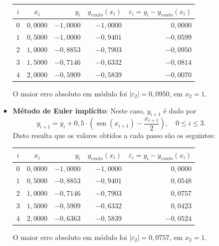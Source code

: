 \documentclass[12pt,a4paper]{article}
\newcommand*\sen{\operatorname{sen}}
\begin{document}
\begin{enumerate}
\begin{enumerate}
\begin{itemize}
\medskip
\begin{center}
\begin{tabular}{ccrrr}
\hline
$i$ & $x_i$ & $y_i$ & $y_{exato}(x_i)$ & $\varepsilon_i = y_i-y_{exato}(x_i)$ \\ \hline
$0$ & $0,0000$ & $-1,0000$ & $-1,0000$ & $ 0,0000$ \\
$1$ & $0,5000$ & $-1,0000$ & $-0,9401$ & $-0,0599$ \\
$2$ & $1,0000$ & $-0,8853$ & $-0,7903$ & $-0,0950$ \\
$3$ & $1,5000$ & $-0,7146$ & $-0,6332$ & $-0,0814$ \\
$4$ & $2,0000$ & $-0,5909$ & $-0,5839$ & $-0,0070$ \\
\hline
\end{tabular}
\end{center}
\medskip
O maior erro absoluto em módulo foi $|\varepsilon_2| = 0,0950$, em $x_2 = 1$.

\item \textbf{Método de Euler implícito}: Neste caso, $y_{i + 1}$ é dado por
\[
y_{i + 1}
= y_{i} + 0,5 \cdot \left( \sen(x_{i + 1}) - \frac{x_{i + 1}}{2} \right),
\quad 0 \leq i \leq 3.
\]
Disto resulta que os valores obtidos a cada passo são os seguintes:

\medskip
\begin{center}
\begin{tabular}{ccrrr}
\hline
$i$ & $x_i$ & $y_i$ & $y_{exato}(x_i)$ & $\varepsilon_i = y_i-y_{exato}(x_i)$ \\ \hline
$0$ & $0,0000$ & $-1,0000$ & $-1,0000$ & $ 0,0000$ \\
$1$ & $0,5000$ & $-0,8853$ & $-0,9401$ & $ 0,0548$ \\
$2$ & $1,0000$ & $-0,7146$ & $-0,7903$ & $ 0,0757$ \\
$3$ & $1,5000$ & $-0,5909$ & $-0,6332$ & $ 0,0423$ \\
$4$ & $2,0000$ & $-0,6363$ & $-0,5839$ & $-0,0524$ \\
\hline
\end{tabular}
\end{center}
\medskip
O maior erro absoluto em módulo foi $|\varepsilon_2| = 0,0757$, em $x_2 = 1$.


\end{itemize}
\end{enumerate}
\end{enumerate}
\end{document}
